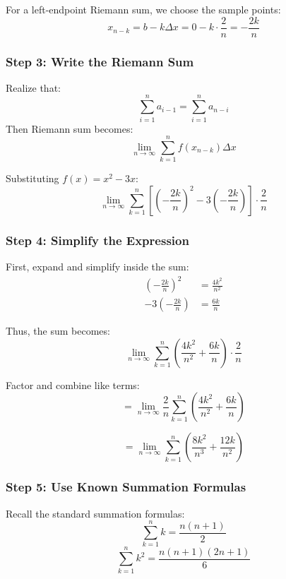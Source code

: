 \documentclass{article}
\begin{document}
For a left-endpoint Riemann sum, we choose the sample points:
\\
\[
x_{n-k} = b - k\Delta x = 0 - k \cdot \frac{2}{n} = -\frac{2k}{n}
\]

\subsubsection*{Step 3: Write the Riemann Sum}
Realize that:\\
\[
\sum_{i=1}^na_{i-1}=\sum_{i=1}^na_{n-i}
\]
Then Riemann sum becomes:
\\
\[
\lim_{n \to \infty} \sum_{k=1}^{n} f(x_{n-k}) \Delta x
\]

Substituting $f(x) = x^2 - 3x$:
\\
\[
\lim_{n \to \infty} \sum_{k=1}^{n} \left[ \left(-\frac{2k}{n}\right)^2 - 3\left(-\frac{2k}{n}\right) \right] \cdot \frac{2}{n}
\]

\subsubsection*{Step 4: Simplify the Expression}

First, expand and simplify inside the sum:
\\
\begin{align*}
\left(-\frac{2k}{n}\right)^2 &= \frac{4k^2}{n^2} \\
-3\left(-\frac{2k}{n}\right) &= \frac{6k}{n}
\end{align*}

Thus, the sum becomes:
\\
\[
\lim_{n \to \infty} \sum_{k=1}^{n} \left( \frac{4k^2}{n^2} + \frac{6k}{n} \right) \cdot \frac{2}{n}
\]

Factor and combine like terms:
\\
\[
= \lim_{n \to \infty} \frac{2}{n} \sum_{k=1}^{n} \left( \frac{4k^2}{n^2} + \frac{6k}{n} \right)
\]

\[
= \lim_{n \to \infty} \sum_{k=1}^{n} \left( \frac{8k^2}{n^3} + \frac{12k}{n^2} \right)
\]

\subsubsection*{Step 5: Use Known Summation Formulas}

Recall the standard summation formulas:
\\
\[
\sum_{k=1}^{n} k = \frac{n(n+1)}{2}
\]
\[
\sum_{k=1}^{n} k^2 = \frac{n(n+1)(2n+1)}{6}
\]
\end{document}
